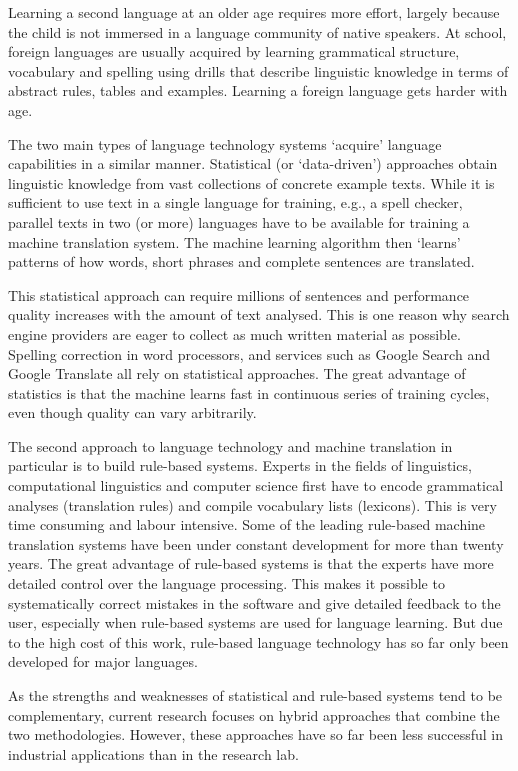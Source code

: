 \documentclass{scrartcl}
\begin{document}
\begin{Parallel}[c]{70mm}{70mm}
{    Learning a second language at an older age requires more effort, largely because the child is not immersed in a language community of native speakers. At school, foreign languages are usually acquired by learning grammatical structure, vocabulary and spelling using drills that describe linguistic knowledge in terms of abstract rules, tables and examples. Learning a foreign language gets harder with age.

    The two main types of language technology systems `acquire' language capabilities in a similar manner. Statistical (or `data-driven') approaches obtain linguistic knowledge from vast collections of concrete example texts. While it is sufficient to use text in a single language for training, e.g., a spell checker, parallel texts in two (or more) languages have to be available for training a machine translation system. The machine learning algorithm then `learns' patterns of how words, short phrases and complete sentences are translated.

    This statistical approach can require millions of sentences and performance quality increases with the amount of text analysed. This is one reason why search engine providers are eager to collect as much written material as possible. Spelling correction in word processors, and services such as Google Search and Google Translate all rely on statistical approaches. The great advantage of statistics is that the machine learns fast in continuous series of training cycles, even though quality can vary arbitrarily.

    The second approach to language technology and machine translation in particular is to build rule-based systems. Experts in the fields of linguistics, computational linguistics and computer science first have to encode grammatical analyses (translation rules) and compile vocabulary lists (lexicons). This is very time consuming and labour intensive. Some of the leading rule-based machine translation systems have been under constant development for more than twenty years. The great advantage of rule-based systems is that the experts have more detailed control over the language processing. This makes it possible to systematically correct mistakes in the software and give detailed feedback to the user, especially when rule-based systems are used for language learning. But due to the high cost of this work, rule-based language technology has so far only been developed for major languages.

    As the strengths and weaknesses of statistical and rule-based systems tend to be complementary, current research focuses on hybrid approaches that combine the two methodologies. However, these approaches have so far been less successful in industrial applications than in the research lab.

}
\end{Parallel}
\end{document}
